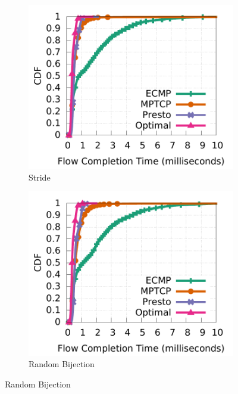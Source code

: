 \begin{figure}[!t]
        \centering
	\begin{subfigure}[b]{0.3\textwidth}
                \centering
  		\includegraphics[width=\textwidth]{./figures/macro/stride/macro_compare_fct_stride_mice.pdf}
        	\caption{Stride}
        	\label{macro_evaluation_fct_stride}
	\end{subfigure}
	\begin{subfigure}[b]{0.3\textwidth}
                \centering
		\includegraphics[width=\textwidth]{./figures/macro/bijection/macro_compare_fct_bijection_mice.pdf}
        	\caption{Random Bijection}

\end{subfigure}
\end{figure}
